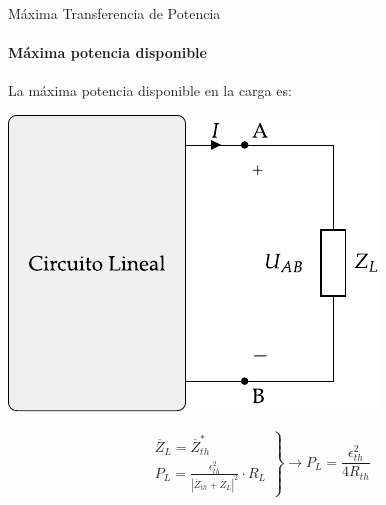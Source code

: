 \documentclass[aspectratio=169, usenames,svgnames,dvipsnames]{beamer}
\begin{document}
\begin{frame}[label={sec:org47d7c8b}]{Máxima Transferencia de Potencia}
\framesubtitle{Máxima potencia disponible}

La máxima potencia disponible en la carga es:
\begin{center}
\includegraphics[height=0.45\textheight]{../figs/EquivalenteThevenin.pdf}
\end{center}

\begin{equation*}
  \left.
    \begin{matrix}
      \overline{Z}_L = \overline{Z}_{th}^*\\
      P_L = \frac{\epsilon^2_{th}}{|\overline{Z}_{th} + \overline{Z}_L|^2} \cdot R_L
    \end{matrix} \right\}\rightarrow
  \boxed{P_L = \frac{\epsilon^2_{th}}{4 R_{th}}}
\end{equation*}
\end{frame}
\end{document}
